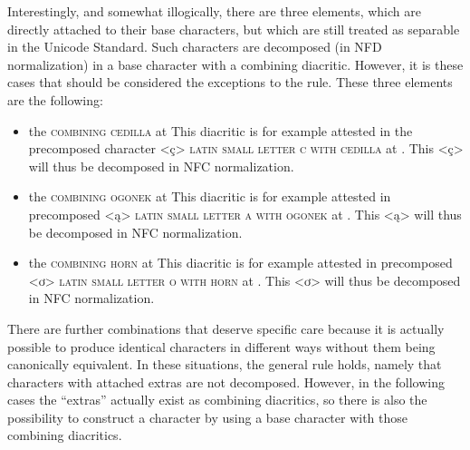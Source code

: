 Interestingly, and somewhat illogically, there are three elements, which are
directly attached to their base characters, but which are still treated as
separable in the Unicode Standard. Such characters are decomposed (in NFD
normalization) in a base character with a combining diacritic. However, it is
these cases that should be considered the exceptions to the rule. These three 
elements are the following:

\begin{itemize}

  \item the \textsc{combining cedilla} at  \newline This diacritic is
        for example attested in the precomposed character <ç> \textsc{latin
        small letter c with cedilla} at . This <ç> will thus be
        decomposed in NFC normalization.
  \item the \textsc{combining ogonek} at  \newline This diacritic is
        for example attested in precomposed <ą> \textsc{latin small letter a
        with ogonek} at . This <ą> will thus be decomposed in NFC
        normalization.
  \item the \textsc{combining horn} at  \newline This diacritic is for
        example attested in precomposed <ơ> \textsc{latin small letter o with
        horn} at . This <ơ> will thus be decomposed in NFC
        normalization. 

\end{itemize}

There are further combinations that deserve specific care because it is actually
possible to produce identical characters in different ways without them being
canonically equivalent. In these situations, the general rule holds, namely that
characters with attached extras are not decomposed. However, in the following
cases the ``extras'' actually exist as combining diacritics, so there is also 
the possibility to construct a character by using a base character with those 
combining diacritics.

